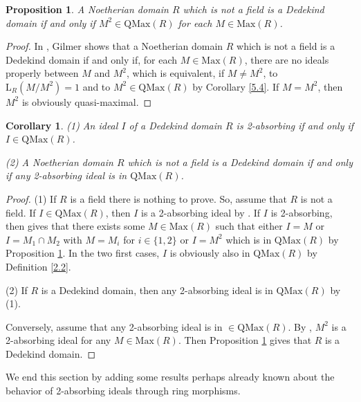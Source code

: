 \documentclass[12pt,leqno]{amsart}
\newtheorem{proposition}[theorem]{Proposition}
\newtheorem{corollary}[theorem]{Corollary}
\theoremstyle{definition}
\begin{document}
\begin{proposition}\label{5.5} A Noetherian domain $R$ which is not a field is a Dedekind domain if and only if $M^2\in\mathrm{QMax}(R)$ for each $M\in\mathrm{Max}(R)$.
\end{proposition}

\begin{proof} In \cite[Theorem 38.1]{MIT},  Gilmer shows that a Noetherian  domain $R$ which is not a field is a Dedekind domain if and only if, for each $M\in\mathrm{Max}(R)$, there are no ideals properly between $M$ and $M^2$, which is equivalent, if $M\neq M^2$, to $\mathrm{L}_R(M/M^2)=1$ and to $M^2\in\mathrm{QMax}(R)$ by Corollary \ref{5.4}. If $M=M^2$, then $M^2$ is obviously quasi-maximal. 
\end{proof} 

\begin{corollary}\label{5.6} (1) An ideal $I$ of a Dedekind domain $R$ 
 is 2-absorbing if and only if $I\in\mathrm{QMax}(R)$.
 
(2) A Noetherian domain $R$ which is not a field is a Dedekind domain if and only if any 2-absorbing ideal is in $\mathrm {QMax}(R)$.
\end{corollary}

\begin{proof} (1) If $R$ is a field there is nothing to prove. So, assume that $R$ is not a field. If $I\in\mathrm{QMax}(R)$, then $I$ is a 2-absorbing ideal by \cite[Theorem 1]{AKKT}. If $I$ is 2-absorbing, then \cite[Theorem 3.15]{Ba} gives that there exists some $M\in\mathrm{Max}(R)$ such that either $I=M$ or $I=M_1\cap M_2$ with $M=M_i$ for $i\in\{1,2\}$ or $I=M^2 $ which is in $\mathrm{QMax}(R)$ by Proposition \ref{5.5}. In the two first cases, $I$ is obviously also in $\mathrm{QMax}(R)$ by Definition \ref{2.2}.

(2) If $R$ is a Dedekind domain, then any 2-absorbing ideal is in $\mathrm{QMax}(R)$ by (1).

Conversely, assume that any 2-absorbing ideal is in $\in\mathrm{QMax}(R)$. By \cite[Theorem 3.1]{Ba}, $M^2$ is a 2-absorbing ideal for any $M\in\mathrm{Max}(R)$. Then Proposition \ref{5.5} gives that $R$ is a Dedekind domain. 
\end{proof} 

We end this section by adding some results perhaps already known about the behavior of 2-absorbing ideals through ring morphisms. 
\end{document}
